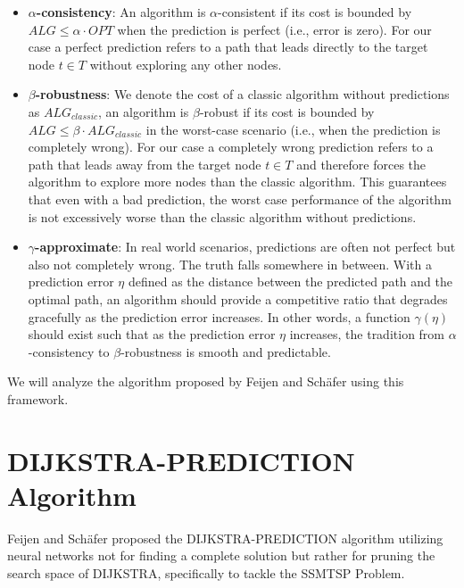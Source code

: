 \begin{itemize}
    \item \textbf{$\alpha$-consistency}: An algorithm is $\alpha$-consistent if its cost is bounded by $ALG \le \alpha \cdot OPT$ when the prediction is perfect (i.e., error is zero).
    For our case a perfect prediction refers to a path that leads directly to the target node $t \in T$ without exploring any other nodes.
    \item \textbf{$\beta$-robustness}: We denote the cost of a classic algorithm without predictions as $ALG_{classic}$, an algorithm is $\beta$-robust if its cost is bounded by $ALG \le \beta \cdot ALG_{classic}$ in the worst-case scenario (i.e., when the prediction is completely wrong).
    For our case a completely wrong prediction refers to a path that leads away from the target node $t \in T$ and therefore forces the algorithm to explore more nodes than the classic algorithm.
    This guarantees that even with a bad prediction, the worst case performance of the algorithm is not excessively worse than the classic algorithm without predictions.
    \item \textbf{$\gamma$-approximate}: In real world scenarios, predictions are often not perfect but also not completely wrong. The truth falls somewhere in between. 
    With a prediction error $\eta$ defined as the distance between the predicted path and the optimal path, an algorithm should provide a competitive ratio that degrades gracefully as the prediction error increases.
    In other words, a function $\gamma(\eta)$ should exist such that as the prediction error $\eta$ increases, the tradition from $\alpha$-consistency to $\beta$-robustness is smooth and predictable.
\end{itemize}

We will analyze the algorithm proposed by Feijen and Schäfer\cite{feijenDijkstrasAlgorithmPredictions2023} using this framework.

\section{DIJKSTRA-PREDICTION Algorithm} \label{sec:dijkstra-prediction}

Feijen and Schäfer\cite{feijenDijkstrasAlgorithmPredictions2023} proposed the \textsc{DIJKSTRA-PREDICTION} algorithm utilizing neural networks not for finding a complete solution but rather 
for pruning the search space of \textsc{DIJKSTRA}, specifically to tackle the SSMTSP Problem. 

